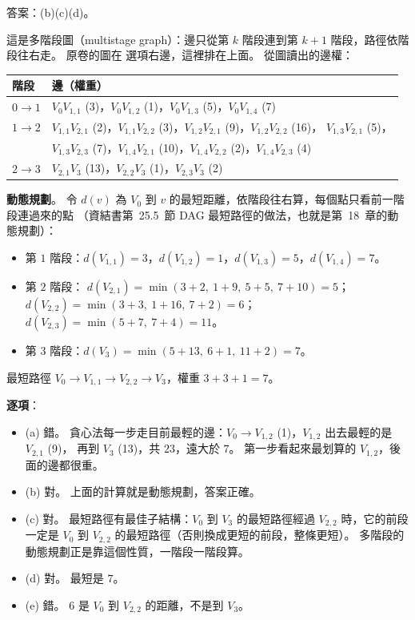 \begin{pastsoln}
答案：(b)(c)(d)。

這是多階段圖（multistage graph）：邊只從第 $k$ 階段連到第 $k + 1$ 階段，路徑依階段往右走。 原卷的圖在
選項右邊，這裡排在上面。 從圖讀出的邊權：
\begin{center}
\small
\begin{tabular}{ll}
\toprule
階段 & 邊（權重） \\
\midrule
$0 \to 1$ & $V_0V_{1,1}$ (3)，$V_0V_{1,2}$ (1)，$V_0V_{1,3}$ (5)，$V_0V_{1,4}$ (7) \\
$1 \to 2$ & $V_{1,1}V_{2,1}$ (2)，$V_{1,1}V_{2,2}$ (3)，$V_{1,2}V_{2,1}$ (9)，$V_{1,2}V_{2,2}$ (16)，
$V_{1,3}V_{2,1}$ (5)， \\
& $V_{1,3}V_{2,3}$ (7)，$V_{1,4}V_{2,1}$ (10)，$V_{1,4}V_{2,2}$ (2)，$V_{1,4}V_{2,3}$ (4) \\
$2 \to 3$ & $V_{2,1}V_3$ (13)，$V_{2,2}V_3$ (1)，$V_{2,3}V_3$ (2) \\
\bottomrule
\end{tabular}
\end{center}

\textbf{動態規劃}。 令 $d(v)$ 為 $V_0$ 到 $v$ 的最短距離，依階段往右算，每個點只看前一階段連過來的點
（資結書第~25.5~節 DAG 最短路徑的做法，也就是第~18~章的動態規劃）：
\begin{itemize}
\item 第 $1$ 階段：$d(V_{1,1}) = 3$，$d(V_{1,2}) = 1$，$d(V_{1,3}) = 5$，$d(V_{1,4}) = 7$。
\item 第 $2$ 階段：
$d(V_{2,1}) = \min(3 + 2,\ 1 + 9,\ 5 + 5,\ 7 + 10) = 5$；
$d(V_{2,2}) = \min(3 + 3,\ 1 + 16,\ 7 + 2) = 6$；
$d(V_{2,3}) = \min(5 + 7,\ 7 + 4) = 11$。
\item 第 $3$ 階段：$d(V_3) = \min(5 + 13,\ 6 + 1,\ 11 + 2) = 7$。
\end{itemize}
最短路徑 $V_0 \to V_{1,1} \to V_{2,2} \to V_3$，權重 $3 + 3 + 1 = 7$。

\textbf{逐項}：
\begin{itemize}
\item (a) 錯。 貪心法每一步走目前最輕的邊：$V_0 \to V_{1,2}$ (1)，$V_{1,2}$ 出去最輕的是 $V_{2,1}$ (9)，
再到 $V_3$ (13)，共 $23$，遠大於 $7$。 第一步看起來最划算的 $V_{1,2}$，後面的邊都很重。
\item (b) 對。 上面的計算就是動態規劃，答案正確。
\item (c) 對。 最短路徑有最佳子結構：$V_0$ 到 $V_3$ 的最短路徑經過 $V_{2,2}$ 時，它的前段一定是 $V_0$ 到
$V_{2,2}$ 的最短路徑（否則換成更短的前段，整條更短）。 多階段的動態規劃正是靠這個性質，一階段一階段算。
\item (d) 對。 最短是 $7$。
\item (e) 錯。 $6$ 是 $V_0$ 到 $V_{2,2}$ 的距離，不是到 $V_3$。
\end{itemize}
\end{pastsoln}
